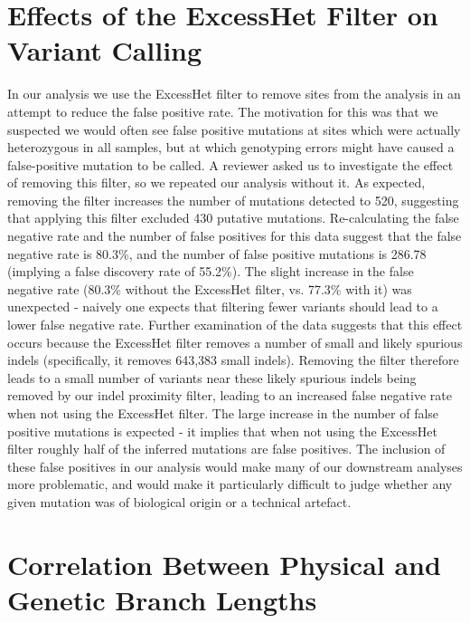 \section{Effects of the ExcessHet Filter on Variant Calling}

In our analysis we use the ExcessHet filter to remove sites from the analysis in an attempt to reduce the false positive rate. The motivation for this was that we suspected we would often see false positive mutations at sites which were actually heterozygous in all samples, but at which genotyping errors might have caused a false-positive mutation to be called. A reviewer asked us to investigate the effect of removing this filter, so we repeated our analysis without it. As expected, removing the filter increases the number of mutations detected to 520, suggesting that applying this filter excluded 430 putative mutations. Re-calculating the false negative rate and the number of false positives for this data suggest that the false negative rate is 80.3\%, and the number of false positive mutations is 286.78 (implying a false discovery rate of 55.2\%). The slight increase in the false negative rate (80.3\% without the ExcessHet filter, vs. 77.3\% with it) was unexpected - naively one expects that filtering fewer variants should lead to a lower false negative rate. Further examination of the data suggests that this effect occurs because the ExcessHet filter removes a number of small and likely spurious indels (specifically, it removes 643,383 small indels). Removing the filter therefore leads to a small number of variants near these likely spurious indels being removed by our indel proximity filter, leading to an increased false negative rate when not using the ExcessHet filter. The large increase in the number of false positive mutations is expected - it implies that when not using the ExcessHet filter roughly half of the inferred mutations are false positives. The inclusion of these false positives in our analysis would make many of our downstream analyses more problematic, and would make it particularly difficult to judge whether any given mutation was of biological origin or a technical artefact. 

\section{Correlation Between Physical and Genetic Branch Lengths}

